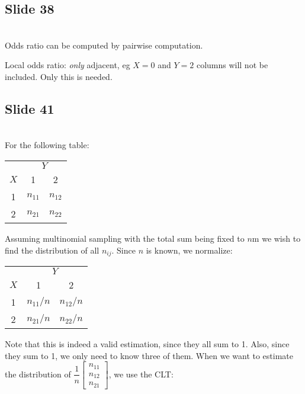 \subsection{Slide 38}\hfill\\
\noindent Odds ratio can be computed by pairwise computation.\par
\noindent Local odds ratio: \textit{only} adjacent, eg $X = 0$ and $Y = 2$ columns will not be included. Only this is needed.
\par\bigskip
\subsection{Slide 41}\hfill\\
\noindent For the following table:
\begin{center}
  \begin{tabular}{ccc}
    &\multicolumn{2}{c}{$Y$}\\
    \cmidrule{2-3}
    $X$&1&2\\
    \midrule
    1&$n_{11}$&$n_{12}$\\
    2&$n_{21}$&$n_{22}$
  \end{tabular}
\end{center}\par
\noindent Assuming multinomial sampling with the total sum being fixed to $n$m we wish to find the distribution of all $n_{ij}$. Since $n$ is known, we normalize:\par
\begin{center}
  \begin{tabular}{ccc}
    &\multicolumn{2}{c}{$Y$}\\
    \cmidrule{2-3}
    $X$&1&2\\
    \midrule
    1&$n_{11}/n$&$n_{12}/n$\\
    2&$n_{21}/n$&$n_{22}/n$
  \end{tabular}
\end{center}\par
\noindent Note that this is indeed a valid estimation, since they all sum to 1. Also, since they sum to 1, we only need to know three of them. When we want to estimate the distribution of $\dfrac{1}{n}\begin{bmatrix}n_{11}\\n_{12}\\n_{21}\end{bmatrix}$, we use the CLT:
